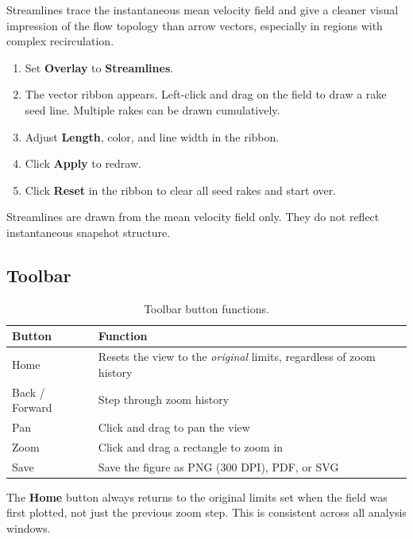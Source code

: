 \documentclass[11pt, a4paper]{report}
\newcommand{\uipth}[1]{\textbf{\textcolor{upblue}{#1}}}
\begin{document}
Streamlines trace the instantaneous mean velocity field and give a cleaner visual impression of the flow topology than arrow vectors, especially in regions with complex recirculation.

\begin{stepbox}
\begin{enumerate}[leftmargin=1.5em, topsep=2pt]
  \item Set \uipth{Overlay} to \uipth{Streamlines}.
  \item The vector ribbon appears. Left-click and drag on the field to draw a rake seed line. Multiple rakes can be drawn cumulatively.
  \item Adjust \uipth{Length}, color, and line width in the ribbon.
  \item Click \uipth{Apply} to redraw.
  \item Click \uipth{Reset} in the ribbon to clear all seed rakes and start over.
\end{enumerate}
\end{stepbox}

\begin{notebox}
Streamlines are drawn from the mean velocity field only. They do not reflect instantaneous snapshot structure.
\end{notebox}

\subsection{Toolbar}

\begin{table}[htbp]
\centering
\caption{Toolbar button functions.}
\begin{tabular}{ll}
\toprule
\textbf{Button} & \textbf{Function} \\
\midrule
Home           & Resets the view to the \emph{original} limits, regardless of zoom history \\
Back / Forward & Step through zoom history \\
Pan            & Click and drag to pan the view \\
Zoom           & Click and drag a rectangle to zoom in \\
Save           & Save the figure as PNG (300 DPI), PDF, or SVG \\
\bottomrule
\end{tabular}
\end{table}

\begin{notebox}
The \textbf{Home} button always returns to the original limits set when the field was first plotted, not just the previous zoom step. This is consistent across all analysis windows.
\end{notebox}
\end{document}
